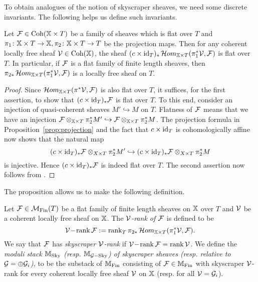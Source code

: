 \documentclass[12pt]{amsart}
\begin{document}
To obtain analogues of the notion of skyscraper sheaves, we need some discrete invariants. The following helps us define such invariants. 
\begin{proposition}  \label{prop:cstarflat}
Let $\mathcal{F} \in \operatorname{Coh}(\mathbb{X} \times T)$ be a family of sheaves which is flat over $T$ and $\pi_1 \colon \mathbb{X} \times T \to \mathbb{X}, \pi_2 \colon \mathbb{X} \times T \to T$ be the projection maps. Then for any coherent locally free sheaf $\mathcal{V} \in \operatorname{Coh}(\mathbb{X})$, the sheaf $(c\times \operatorname{id}_T)_*\mathop{{\mathcal{H}}om}\nolimits_{\mathbb{X} \times T}(\pi_1^*\mathcal{V}, \mathcal{F})$ is flat over $T$. In particular, if $\mathcal{F}$ is a flat family of finite length sheaves, then $\pi_{2*}\mathop{{\mathcal{H}}om}\nolimits_{\mathbb{X} \times T}(\pi_1^*\mathcal{V}, \mathcal{F})$ is a locally free sheaf on $T$. 
\end{proposition}
\begin{proof}
Since $\mathop{{\mathcal{H}}om}\nolimits_{\mathbb{X} \times T}(\pi^*\mathcal{V}, \mathcal{F})$ is also flat over $T$, it suffices, for the first assertion, to show that $(c \times \operatorname{id}_T)_* \mathcal{F}$ is flat over $T$. To this end, consider an injection of quasi-coherent sheaves $M' \hookrightarrow M$ on $T$. Flatness of $\mathcal{F}$ means that we have an injection $\mathcal{F} \otimes_{\mathbb{X} \times T} \pi_2^* M' \hookrightarrow \mathcal{F} \otimes_{\mathbb{X} \times T} \pi_2^* M$. The projection formula in Proposition~\ref{prop:projection} and the fact that $c \times \operatorname{id}_T$ is cohomologically affine now shows that the natural map
$$ (c \times \operatorname{id}_T)_* \mathcal{F} \otimes_{X \times T} \pi_2^*M' \hookrightarrow (c \times \operatorname{id}_T)_* \mathcal{F} \otimes_{X \times T} \pi_2^*M$$
is injective. Hence $(c \times \operatorname{id}_T)_* \mathcal{F}$ is indeed flat over $T$. The second assertion now follows from \cite[Proposition~9.2(d)]{Hart}. 
\end{proof}

The proposition allows us to make the following definition. 
\begin{definition}
Let $\mathcal{F}\in \mathcal{M}_{\textup{Fin}}(T)$ be a flat family of finite length sheaves on $\mathbb{X}$ over $T$ and $\mathcal{V}$ be a coherent locally free sheaf on $\mathbb{X}$. The {\em $\mathcal{V}$-rank of $\mathcal{F}$} is defined to be 
$$\mathcal{V}\!-\!\operatorname{rank} \mathcal{F} := \operatorname{rank}_T \pi_{2*} \mathop{{\mathcal{H}}om}\nolimits_{\mathbb{X} \times T}(\pi_1^* \mathcal{V}, \mathcal{F}).$$
We say that $\mathcal{F}$ has {\em skyscraper $\mathcal{V}$-rank} if $\mathcal{V}\!-\!\operatorname{rank} \mathcal{F} = \operatorname{rank} \mathcal{V}$. We define the {\em moduli stack $\mathbb{M}_{\textup{Sky}}$ (resp. $\mathbb{M}_{\mathcal{G}-\textup{Sky}}$) of skyscraper sheaves (resp. relative to $\mathcal{G} = \oplus \mathcal{G}_i$)}, to be the substack of $\mathbb{M}_{\textup{Fin}}$ consisting of $\mathcal{F} \in \mathbb{M}_{\textup{Fin}}$ with skyscraper $\mathcal{V}$-rank for every coherent locally free sheaf $\mathcal{V}$ on $\mathbb{X}$ (resp. for all $\mathcal{V} = \mathcal{G}_i$). 
\end{definition}
\end{document}
